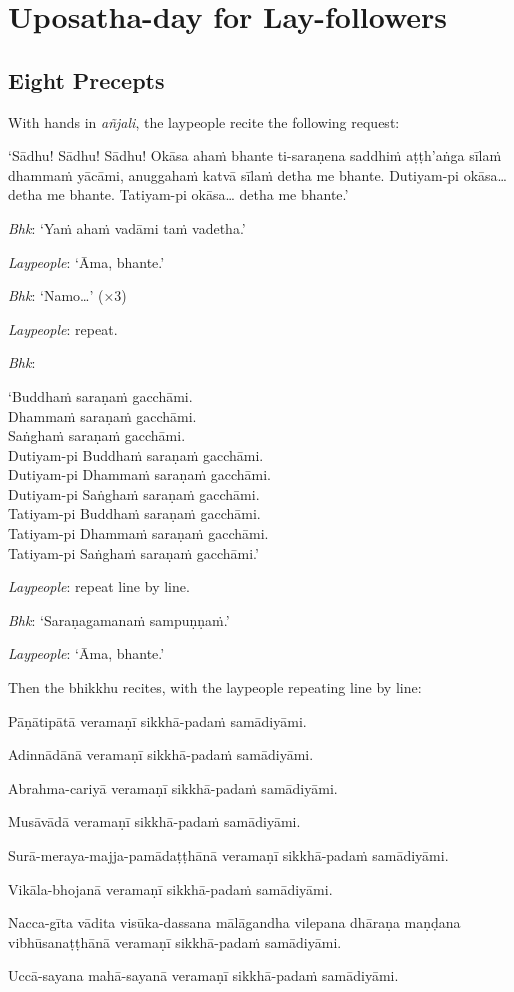 \section{Uposatha-day for Lay-followers}

\subsection{Eight Precepts}

With hands in \emph{añjali}, the laypeople recite the following request:

‘Sādhu! Sādhu! Sādhu! Okāsa ahaṁ bhante ti-saraṇena saddhiṁ aṭṭh'aṅga sīlaṁ
dhammaṁ yācāmi, anuggahaṁ katvā sīlaṁ detha me bhante. Dutiyam-pi okāsa… detha
me bhante. Tatiyam-pi okāsa… detha me bhante.’

\emph{Bhk}: ‘Yaṁ ahaṁ vadāmi taṁ vadetha.’

\emph{Laypeople}: ‘Āma, bhante.’

\emph{Bhk}: ‘Namo…’ (×3)

\emph{Laypeople}: repeat.

\emph{Bhk}:

‘Buddhaṁ saraṇaṁ gacchāmi.\\
Dhammaṁ saraṇaṁ gacchāmi.\\
Saṅghaṁ saraṇaṁ gacchāmi.\\
Dutiyam-pi Buddhaṁ saraṇaṁ gacchāmi.\\
Dutiyam-pi Dhammaṁ saraṇaṁ gacchāmi.\\
Dutiyam-pi Saṅghaṁ saraṇaṁ gacchāmi.\\
Tatiyam-pi Buddhaṁ saraṇaṁ gacchāmi.\\
Tatiyam-pi Dhammaṁ saraṇaṁ gacchāmi.\\
Tatiyam-pi Saṅghaṁ saraṇaṁ gacchāmi.’

\emph{Laypeople}: repeat line by line.

\emph{Bhk}: ‘Saraṇagamanaṁ sampuṇṇaṁ.’

\emph{Laypeople}: ‘Āma, bhante.’

Then the bhikkhu recites, with the laypeople repeating line by line:

\begin{packeditemize}

\item Pāṇātipātā veramaṇī sikkhā-padaṁ samādiyāmi.
\item Adinnādānā veramaṇī sikkhā-padaṁ samādiyāmi.
\item Abrahma-cariyā veramaṇī sikkhā-padaṁ samādiyāmi.
\item Musāvādā veramaṇī sikkhā-padaṁ samādiyāmi.
\item Surā-meraya-majja-pamādaṭṭhānā veramaṇī sikkhā-padaṁ samādiyāmi.
\item Vikāla-bhojanā veramaṇī sikkhā-padaṁ samādiyāmi.
\item Nacca-gīta vādita visūka-dassana mālāgandha vilepana dhāraṇa maṇḍana vibhūsanaṭṭhānā veramaṇī sikkhā-padaṁ samādiyāmi.
\item Uccā-sayana mahā-sayanā veramaṇī sikkhā-padaṁ samādiyāmi.

\end{packeditemize}

